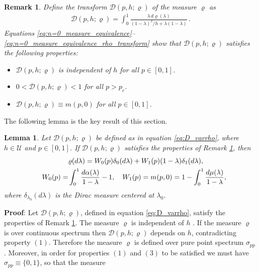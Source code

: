 \documentclass[english,12pt]{ttuthes}
\newtheorem{lemma}{Lemma}[chapter]
\newtheorem{remark}{Remark}[chapter]
\begin{document}
\begin{remark}\label{rem:varrho_condidtions}
  Define the transform $\mathcal{D}(p,h;\varrho)$ of the measure $\varrho$ as
  \begin{align}\label{eq:D_varrho}
    \mathcal{D}(p,h;\varrho)=\int_0^1\frac{\lambda\,d\varrho(\lambda)}{(1-\lambda)^2/h+\lambda(1-\lambda)}\,.
  \end{align}
  Equations
  \eqref{eq:n=0_measure_equivalence}--\eqref{eq:n=0_measure_equivalence_rho_transform}
  show that $\mathcal{D}(p,h;\varrho)$ satisfies the following properties:
  \begin{itemize}
  \item[(1)] $\mathcal{D}(p,h;\varrho)$ is independent of $h$ for
    all $p\in[0,1]$.    
  \item[(2)] $0<\mathcal{D}(p,h;\varrho)<1$ for all $p>p_c$.
  \item[(3)] $\mathcal{D}(p,h;\varrho)\equiv m(p,0)$ for all $p\in[0,1]$.   
  \end{itemize}  
\end{remark}
%
\noindent The following lemma is the key result of this section.
%
\begin{lemma}\label{lem:Measure_consistentcy_condition}
  Let $\mathcal{D}(p,h;\varrho)$ be defined as in equation
  \eqref{eq:D_varrho}, where $h\in\mathcal{U}$ and $p\in[0,1]$. If
  $\mathcal{D}(p,h;\varrho)$ satisfies the properties of Remark
  \ref{rem:varrho_condidtions}, then  
\begin{align}\label{eq:Measure_consistentcy_condition}
 &\varrho(d\lambda)=W_0(p)\delta_0(d\lambda)+W_1(p)(1-\lambda)\delta_1(d\lambda),\\
  \quad W_0(p)=&\int_0^1\frac{d\alpha(\lambda)}{1-\lambda}-1, \quad
  W_1(p)=m(p,0)=1-\int_0^1\frac{d\mu(\lambda)}{1-\lambda}, \notag  
\end{align}
%
where $\delta_{\lambda_0}(d\lambda)$ is the Dirac measure centered at $\lambda_0$.
%
\end{lemma}
%
\noindent \textbf{Proof}:
%
Let $\mathcal{D}(p,h;\varrho)$, defined in equation \eqref{eq:D_varrho},
satisfy the properties of Remark \ref{rem:varrho_condidtions}. The
measure $\varrho$ is independent of $h$ \cite{Golden:CMP-473}. If the
measure $\varrho$ is over continuous spectrum \cite{Reed-1980} then
$\mathcal{D}(p,h;\varrho)$ depends on $h$, contradicting property
$(1)$. Therefore the measure $\varrho$ is defined over pure point spectrum
$\sigma_{pp}$ \cite{Reed-1980}. Moreover, in order for properties $(1)$ and
$(3)$ to be satisfied we must have $\sigma_{pp}\equiv\{0,1\}$, so that the measure
\end{document}
